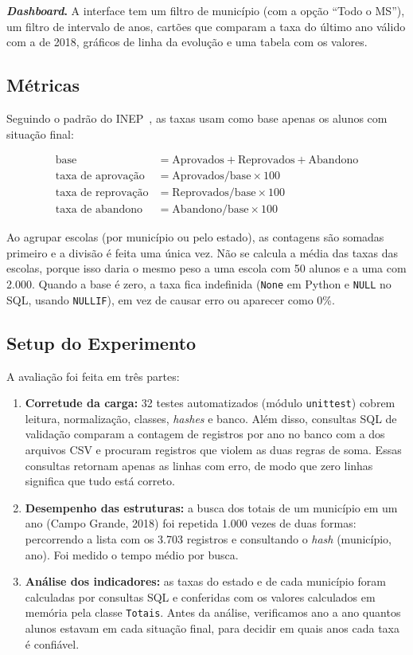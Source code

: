 \documentclass[preprint,10pt,5p]{elsarticle}
\begin{document}
\textbf{\textit{Dashboard}.} A interface tem um filtro de município (com a opção ``Todo o MS''), um filtro de intervalo de anos, cartões que comparam a taxa do último ano válido com a de 2018, gráficos de linha da evolução e uma tabela com os valores.

\subsection{Métricas}

Seguindo o padrão do INEP~\citep{inep2026rendimento}, as taxas usam como base apenas os alunos com situação final:

\begin{align*}
\text{base} &= \text{Aprovados} + \text{Reprovados} + \text{Abandono}\\
\text{taxa de aprovação} &= \text{Aprovados} / \text{base} \times 100\\
\text{taxa de reprovação} &= \text{Reprovados} / \text{base} \times 100\\
\text{taxa de abandono} &= \text{Abandono} / \text{base} \times 100
\end{align*}

Ao agrupar escolas (por município ou pelo estado), as contagens são somadas primeiro e a divisão é feita uma única vez. Não se calcula a média das taxas das escolas, porque isso daria o mesmo peso a uma escola com 50 alunos e a uma com 2.000. Quando a base é zero, a taxa fica indefinida (\texttt{None} em Python e \texttt{NULL} no SQL, usando \texttt{NULLIF}), em vez de causar erro ou aparecer como 0\%.

\subsection{Setup do Experimento}

A avaliação foi feita em três partes:

\begin{enumerate}
    \item \textbf{Corretude da carga:} 32 testes automatizados (módulo \texttt{unittest}) cobrem leitura, normalização, classes, \textit{hashes} e banco. Além disso, consultas SQL de validação comparam a contagem de registros por ano no banco com a dos arquivos CSV e procuram registros que violem as duas regras de soma. Essas consultas retornam apenas as linhas com erro, de modo que zero linhas significa que tudo está correto.
    \item \textbf{Desempenho das estruturas:} a busca dos totais de um município em um ano (Campo Grande, 2018) foi repetida 1.000 vezes de duas formas: percorrendo a lista com os 3.703 registros e consultando o \textit{hash} (município, ano). Foi medido o tempo médio por busca.
    \item \textbf{Análise dos indicadores:} as taxas do estado e de cada município foram calculadas por consultas SQL e conferidas com os valores calculados em memória pela classe \texttt{Totais}. Antes da análise, verificamos ano a ano quantos alunos estavam em cada situação final, para decidir em quais anos cada taxa é confiável.
\end{enumerate}
\end{document}
